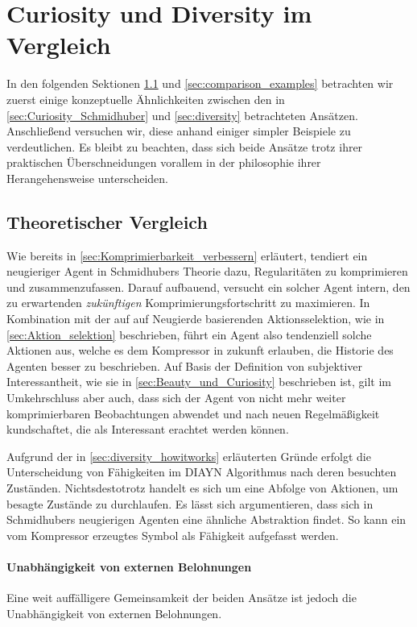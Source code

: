 \section{Curiosity und Diversity im Vergleich}
\label{sec:comparison}
In den folgenden Sektionen \ref{sec:comparison_theory} und \ref{sec:comparison_examples} betrachten wir zuerst einige konzeptuelle Ähnlichkeiten zwischen den in \ref{sec:Curiosity_Schmidhuber} und \ref{sec:diversity} betrachteten Ansätzen. Anschließend versuchen wir, diese anhand einiger simpler Beispiele zu verdeutlichen. 
Es bleibt zu beachten, dass sich beide Ansätze trotz ihrer praktischen Überschneidungen vorallem in der philosophie ihrer Herangehensweise unterscheiden.

\subsection{Theoretischer Vergleich}
\label{sec:comparison_theory}

Wie bereits in \ref{sec:Komprimierbarkeit_verbessern} erläutert, tendiert ein neugieriger Agent in Schmidhubers Theorie dazu, Regularitäten zu komprimieren und zusammenzufassen. Darauf aufbauend, versucht ein solcher Agent intern, den zu erwartenden \emph{zukünftigen} Komprimierungsfortschritt zu maximieren. 
In Kombination mit der auf auf Neugierde basierenden Aktionsselektion, wie in \ref{sec:Aktion_selektion} beschrieben, führt ein Agent also tendenziell solche Aktionen aus, welche es dem Kompressor in zukunft erlauben, die Historie des Agenten besser zu beschrieben. 
Auf Basis der Definition von subjektiver Interessantheit, wie sie in \ref{sec:Beauty_und_Curiosity} beschrieben ist, gilt im Umkehrschluss aber auch, dass sich der Agent von nicht mehr weiter komprimierbaren Beobachtungen abwendet und nach neuen Regelmäßigkeit kundschaftet, die als Interessant erachtet werden können.

Aufgrund der in \ref{sec:diversity_howitworks} erläuterten Gründe erfolgt die Unterscheidung von Fähigkeiten im DIAYN Algorithmus nach deren besuchten Zuständen. Nichtsdestotrotz handelt es sich um eine Abfolge von Aktionen, um besagte Zustände zu durchlaufen. Es lässt sich argumentieren, dass sich in Schmidhubers neugierigen Agenten eine ähnliche Abstraktion findet. So kann ein vom Kompressor erzeugtes Symbol als Fähigkeit aufgefasst werden.

\paragraph{Unabhängigkeit von externen Belohnungen}
Eine weit auffälligere Gemeinsamkeit der beiden Ansätze ist jedoch die Unabhängigkeit von externen Belohnungen.

